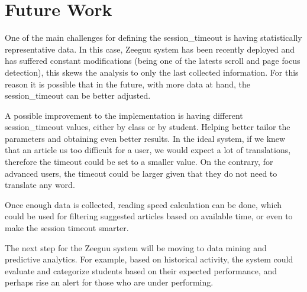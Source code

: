 \chapter{Future Work}

One of the main challenges for defining the session\_timeout is having statistically representative data. In this case, Zeeguu system has been recently deployed and has suffered constant modifications (being one of the latests scroll and page focus detection), this skews the analysis to only the last collected information. For this reason it is possible that in the future, with more data at hand, the session\_timeout can be better adjusted.

A possible improvement to the implementation is having different session\_timeout values, either by class or by student. Helping better tailor the parameters and obtaining even better results. In the ideal system, if we knew that an article us too difficult for a user, we would expect a lot of translations, therefore the timeout could be set to a smaller value. On the contrary, for advanced users, the timeout could be larger given that they do not need to translate any word.

Once enough data is collected, reading speed calculation can be done, which could be used for filtering suggested articles based on available time, or even to make the session timeout smarter.

The next step for the Zeeguu system will be moving to data mining and predictive analytics. For example, based on historical activity, the system could evaluate and categorize students based on their expected performance, and perhaps rise an alert for those who are under performing. 

